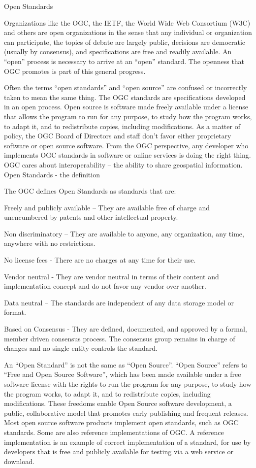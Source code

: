 \documentclass[class=scrbook, crop=false]{standalone}
\begin{document}
Open Standards

Organizations like the OGC, the IETF, the World Wide Web Consortium (W3C) and others are open organizations in the sense that any individual or organization can participate, the topics of debate are largely public, decisions are democratic (usually by consensus), and specifications are free and readily available. An “open” process is necessary to arrive at an “open” standard. The openness that OGC promotes is part of this general progress.

Often the terms “open standards” and “open source” are confused or incorrectly taken to mean the same thing. The OGC standards are specifications developed in an open process. Open source is software made freely available under a license that allows the program to run for any purpose, to study how the program works, to adapt it, and to redistribute copies, including modifications. As a matter of policy, the OGC Board of Directors and staff don’t favor either proprietary software or open source software. From the OGC perspective, any developer who implements OGC standards in software or online services is doing the right thing. OGC cares about interoperability – the ability to share geospatial information.
Open Standards - the definition

The OGC defines Open Standards as standards that are:

    Freely and publicly available – They are available free of charge and unencumbered by patents and other intellectual property.

    Non discriminatory – They are available to anyone, any organization, any time, anywhere with no restrictions.

    No license fees - There are no charges at any time for their use.

    Vendor neutral - They are vendor neutral in terms of their content and implementation concept and do not favor any vendor over another.

    Data neutral – The standards are independent of any data storage model or format.

    Based on Consensus - They are defined, documented, and approved by a formal, member driven consensus process. The consensus group remains in charge of changes and no single entity controls the standard.

An “Open Standard” is not the same as “Open Source”. “Open Source” refers to “Free and Open Source Software”, which has been made available under a free software license with the rights to run the program for any purpose, to study how the program works, to adapt it, and to redistribute copies, including modifications. These freedoms enable Open Source software development, a public, collaborative model that promotes early publishing and frequent releases. Most open source software products implement open standards, such as OGC standards. Some are also reference implementations of OGC. A reference implementation is an example of correct implementation of a standard, for use by developers that is free and publicly available for testing via a web service or download.
\end{document}
